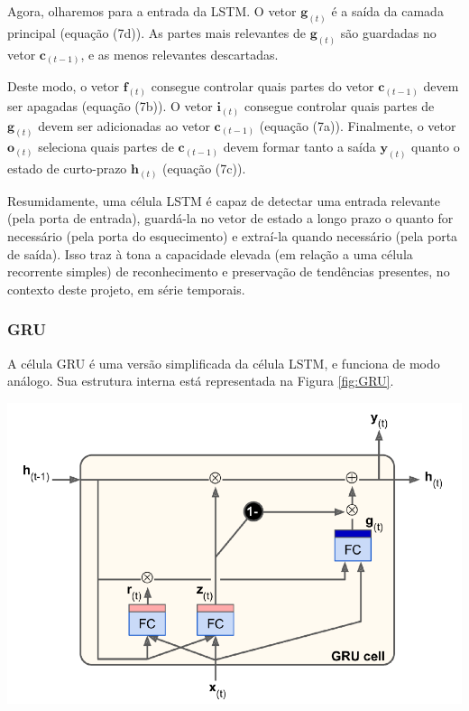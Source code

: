 \documentclass[a4paper]{article}
\newenvironment{Figure}
  {\vspace{0pt}\noindent\minipage{\linewidth}}
  {\endminipage\vspace{5pt}}
\begin{document}
\begin{multicols}{2}
Agora, olharemos para a entrada da LSTM. O vetor $\mathbf{g}_{(t)}$ é a saída da camada principal (equação (7d)). As partes mais relevantes de  $\mathbf{g}_{(t)}$ são guardadas no vetor $\mathbf{c}_{(t-1)}$, e as menos relevantes descartadas.

Deste modo, o vetor $\mathbf{f}_{(t)}$ consegue controlar quais partes do vetor $\mathbf{c}_{(t-1)}$ devem ser apagadas (equação (7b)). O vetor $\mathbf{i}_{(t)}$ consegue controlar quais partes de $\mathbf{g}_{(t)}$
devem ser adicionadas ao vetor $\mathbf{c}_{(t-1)}$ (equação (7a)). Finalmente, o vetor $\mathbf{o}_{(t)}$ seleciona quais partes de $\mathbf{c}_{(t-1)}$ devem formar tanto a saída $\mathbf{y}_{(t)}$ quanto o estado de curto-prazo $\mathbf{h}_{(t)}$ (equação (7c)).

Resumidamente, uma célula LSTM é capaz de detectar uma entrada relevante (pela porta de entrada), guardá-la no vetor de estado a longo prazo o quanto for necessário (pela porta do esquecimento) e extraí-la quando necessário (pela porta de saída). Isso traz à tona a capacidade elevada (em relação a uma célula recorrente simples) de reconhecimento e preservação de tendências presentes, no contexto deste projeto, em série temporais.

\subsubsection{GRU}
\label{subsubsec:gru_descricao}

A célula GRU é uma versão simplificada da célula LSTM, e funciona de modo análogo. Sua estrutura interna está representada na Figura \ref{fig:GRU}.

\begin{Figure}
 \centering
 \includegraphics[width=\linewidth]{GRU.png}
\label{fig:GRU}
\end{Figure}


\end{multicols}
\end{document}
